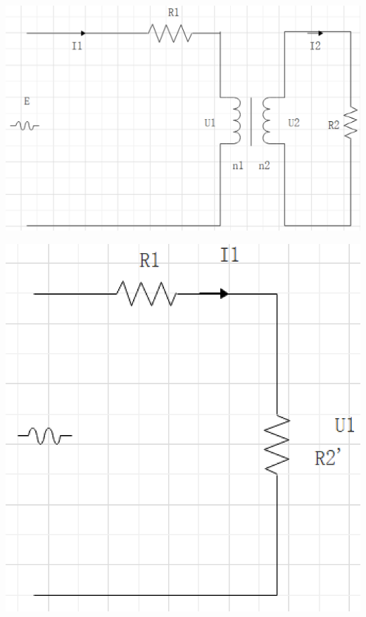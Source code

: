 \documentclass{article}
\begin{document}
\begin{itemize}
\begin{enumerate}[label = (\arabic*)]
                    \begin{minipage}{0.45\textwidth}
                        \includegraphics[width=\textwidth,keepaspectratio]{./pictures/3.7-3.png}
                    \end{minipage}
                    \hfill
                    \begin{minipage}{0.28\textwidth}
                        \includegraphics[width=\textwidth,keepaspectratio]{./pictures/3.7-4.png}
                    \end{minipage}


\end{enumerate}
\end{itemize}
\end{document}
